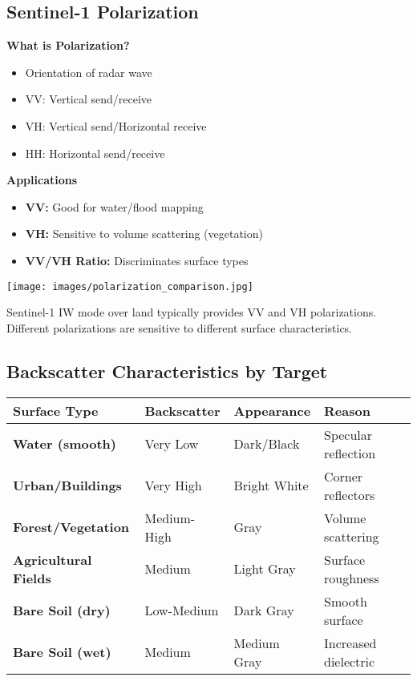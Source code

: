 \documentclass[
  letterpaper,
  DIV=11,
  numbers=noendperiod]{scrartcl}
\providecommand{\tightlist}{%
  \setlength{\itemsep}{0pt}\setlength{\parskip}{0pt}}
\begin{document}
\subsection{Sentinel-1 Polarization}\label{sentinel-1-polarization}

\textbf{What is Polarization?}

\begin{itemize}
\tightlist
\item
  Orientation of radar wave
\item
  VV: Vertical send/receive
\item
  VH: Vertical send/Horizontal receive
\item
  HH: Horizontal send/receive
\end{itemize}

\textbf{Applications}

\begin{itemize}
\tightlist
\item
  \textbf{VV:} Good for water/flood mapping
\item
  \textbf{VH:} Sensitive to volume scattering (vegetation)
\item
  \textbf{VV/VH Ratio:} Discriminates surface types
\end{itemize}

\begin{center}
\texttt{[image: images/polarization\_comparison.jpg]}
\end{center}

Sentinel-1 IW mode over land typically provides VV and VH polarizations.
Different polarizations are sensitive to different surface
characteristics.

\subsection{Backscatter Characteristics by
Target}\label{backscatter-characteristics-by-target}

\begin{longtable}[]{@{}llll@{}}
\toprule\noalign{}
\textbf{Surface Type} & \textbf{Backscatter} & \textbf{Appearance} &
\textbf{Reason} \\
\midrule\noalign{}
\endhead
\bottomrule\noalign{}
\endlastfoot
\textbf{Water (smooth)} & Very Low & Dark/Black & Specular reflection \\
\textbf{Urban/Buildings} & Very High & Bright White & Corner
reflectors \\
\textbf{Forest/Vegetation} & Medium-High & Gray & Volume scattering \\
\textbf{Agricultural Fields} & Medium & Light Gray & Surface
roughness \\
\textbf{Bare Soil (dry)} & Low-Medium & Dark Gray & Smooth surface \\
\textbf{Bare Soil (wet)} & Medium & Medium Gray & Increased
dielectric \\
\end{longtable}
\end{document}
